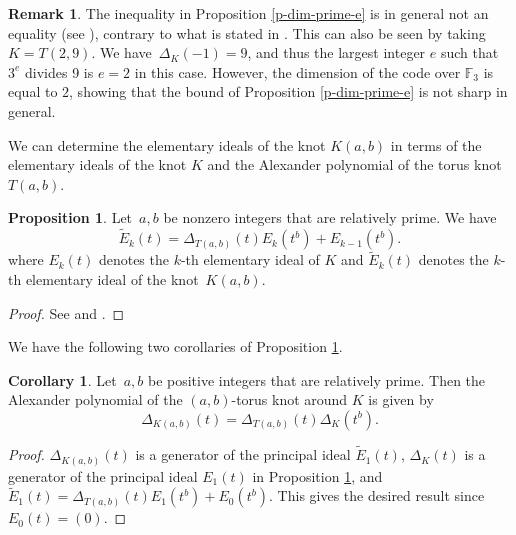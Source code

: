 \documentclass[11pt,a4paper]{article}
\theoremstyle{definition}
\newtheorem{corollary}[theorem]{Corollary}
\newtheorem{proposition}[theorem]{Proposition}
\newtheorem{remark}[theorem]{Remark}
\newcommand{\numberset}{\mathbb}
\newcommand{\F}{\numberset{F}}
\begin{document}
\begin{remark}\label{r-p-order-det} 
The inequality in Proposition \ref{p-dim-prime-e} is in general not an equality (see \cite[Chapter 3, §4, Exercise 4.6]{livingston1993knot}), 
contrary to what is stated in \cite[Theorem 23]{henrich2022}. This can also be seen by taking $K=T(2,9)$. We have~$\Delta_K(-1)=9$, and thus the largest integer $e$ such that $3^e$ divides 9 is $e=2$ in this case. However, the dimension of the code over $\F_3$ is equal to $2$, showing that the bound of Proposition \ref{p-dim-prime-e} is not sharp in general. 
\end{remark}


We can determine the elementary ideals of the knot $K(a,b)$ in terms of the elementary ideals of the knot $K$ and the Alexander polynomial of the torus knot $T(a,b)$.

\begin{proposition}\label{p-elem-torus-around-K}
Let~$a,b$ be nonzero integers that are relatively prime. We have
$$
\tilde{E}_k(t) = \Delta_{T(a,b)}(t)E_k(t^b) + E_{k-1}(t^b).
$$
where $E_k(t)$ denotes the $k$-th elementary ideal of $K$ and $\tilde{E}_k(t)$ denotes the $k$-th elementary ideal  of the knot~$K(a,b)$.
\end{proposition}
\begin{proof}
See \cite{le1972knots} and \cite[Proposition 10.5]{pellikaan1981knopen}.
\end{proof}

We have the following two corollaries of Proposition \ref{p-elem-torus-around-K}.

\begin{corollary}\label{c-alex-torus-around-K}
Let~$a,b$ be positive integers that are relatively prime. Then the Alexander polynomial of the $(a,b)$-torus knot around $K$ is given by
$$
\Delta_{K(a,b)}(t)=\Delta_{T(a,b)}(t)\Delta_K(t^b).
$$
\end{corollary}
\begin{proof}
$\Delta_{K(a,b)}(t)$ is a generator of the principal ideal $\tilde{E}_1(t)$,
$\Delta_K(t)$ is a generator of the principal ideal $E_1(t)$ in Proposition \ref{p-elem-torus-around-K}, and 
$\tilde{E}_1(t) = \Delta_{T(a,b)}(t)E_1(t^b) + E_0(t^b)$. This gives the desired result since $E_0(t) =(0)$.
\end{proof}
\end{document}
